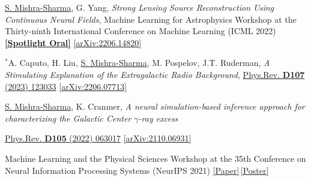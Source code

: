 \documentclass[letterpaper,11pt]{article}
\newenvironment{packed_itemize}{
\begin{itemize}[label=\raisebox{0.25ex}{\tiny$\bullet$}, topsep=0pt, partopsep=0pt]
  \setlength{\itemsep}{4.0pt}
  \setlength{\parskip}{0pt}
  \setlength{\parsep}{0pt}}{\end{itemize}
}
\newenvironment{packed_enumerate}[1][]{
\begin{etaremune}[#1]
  \setlength{\itemsep}{4.0pt}
  \setlength{\parskip}{0pt}
  \setlength{\parsep}{0pt}}{\end{etaremune}
}
\begin{document}
\begin{packed_enumerate}[start=63]
  \item \underline{S. Mishra-Sharma}, G. Yang, \emph{Strong Lensing Source Reconstruction Using Continuous Neural Fields}, {Machine Learning for Astrophysics Workshop at the Thirty-ninth International Conference on Machine Learning (ICML 2022)} \href{https://ml4astro.github.io/icml2022/}{\textbf{[Spotlight Oral]}} \href{https://arxiv.org/abs/2206.14820}{[arXiv:2206.14820]}
   
  \item $^*$A. Caputo, H. Liu, \underline{S. Mishra-Sharma}, M. Pospelov, J.T. Ruderman, \emph{A Stimulating Explanation of the Extragalactic Radio Background}, \href{https://journals.aps.org/prd/abstract/10.1103/PhysRevD.107.123033}{Phys.Rev. \textbf{D107} (2023) 123033} \href{https://arxiv.org/abs/2206.07713}{[arXiv:2206.07713]}
  \item  \underline{S. Mishra-Sharma}, K. Cranmer, \emph{A neural simulation-based inference approach for characterizing the Galactic Center $\gamma$-ray excess}
    \begin{packed_itemize}
      \item {\href{https://journals.aps.org/prd/abstract/10.1103/PhysRevD.105.063017}{Phys.Rev. \textbf{D105} (2022) 063017} \href{https://arxiv.org/abs/2110.06931}{[arXiv:2110.06931]}}
      \item {Machine Learning and the Physical Sciences Workshop at the 35th Conference on Neural Information Processing Systems (NeurIPS 2021) \href{https://ml4physicalsciences.github.io/2020/files/NeurIPS_ML4PS_2020_20.pdf}{[Paper]}\,\href{https://ml4physicalsciences.github.io/2020/files/NeurIPS_ML4PS_2020_20_poster.pdf}{[Poster]}}
    \end{packed_itemize}

\end{packed_enumerate}
\end{document}
